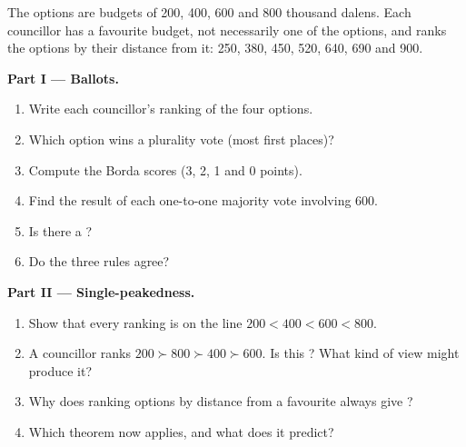 \begin{problem}
\label{pb:b2:social-choice:1}
The options are budgets of 200, 400, 600 and 800 thousand dalens. Each councillor has a favourite budget,
not necessarily one of the options, and ranks the options by their distance from it: 250, 380, 450, 520,
640, 690 and 900.

\medskip
\noindent\textbf{Part I --- Ballots.}
\begin{enumerate}
  \item Write each councillor's ranking of the four options.
  \item Which option wins a plurality vote (most first places)?
  \item Compute the Borda scores (3, 2, 1 and 0 points).
  \item Find the result of each one-to-one majority vote involving 600.
  \item Is there a ?
  \item Do the three rules agree?
\end{enumerate}

\medskip
\noindent\textbf{Part II --- Single-peakedness.}
\begin{enumerate}[resume]
  \item Show that every ranking is  on the line $200 < 400 < 600 < 800$.
  \item A councillor ranks $200 \succ 800 \succ 400 \succ 600$. Is this ? What kind of view might
        produce it?
  \item Why does ranking options by distance from a favourite always give ?
  \item Which theorem now applies, and what does it predict?
\end{enumerate}


\end{problem}
